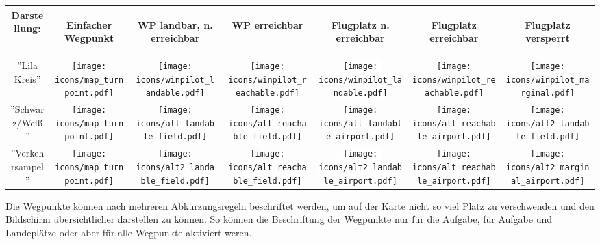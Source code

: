 \begin{tabular}{c|c|cc|ccc|} 
\textbf{Darstellung:} &\begin{sideways}Einfacher Wegpunkt \end{sideways}
&\begin{sideways}WP landbar,  n.  erreichbar\end{sideways}
&\begin{sideways}WP erreichbar\end{sideways}
&\begin{sideways}Flugplatz n. erreichbar\end{sideways}
&\begin{sideways}Flugplatz erreichbar\end{sideways}
&\begin{sideways}Flugplatz versperrt\end{sideways}\\
\hline
''Lila Kreis'' &
\texttt{[image: icons/map\_turnpoint.pdf]} &
\texttt{[image: icons/winpilot\_landable.pdf]} &
\texttt{[image: icons/winpilot\_reachable.pdf]} &
\rule[0em]{0em}{2.5em}\colorbox{white}{\texttt{[image: icons/winpilot\_landable.pdf]}}
& \texttt{[image: icons/winpilot\_reachable.pdf]} 
& \texttt{[image: icons/winpilot\_marginal.pdf]} \\
\hline
''Schwarz/Weiß''  &
\texttt{[image: icons/map\_turnpoint.pdf]} &
\texttt{[image: icons/alt\_landable\_field.pdf]} &
\texttt{[image: icons/alt\_reachable\_field.pdf]} &
\rule[0em]{0em}{2.5em}\colorbox[rgb]{0.94,0.94,0.94}{\texttt{[image: icons/alt\_landable\_airport.pdf]}}
& \texttt{[image: icons/alt\_reachable\_airport.pdf]} 
& \texttt{[image: icons/alt2\_landable\_field.pdf]}\\
\hline
''Verkehrsampel'' &
\texttt{[image: icons/map\_turnpoint.pdf]} &
\texttt{[image: icons/alt2\_landable\_field.pdf]} &
\texttt{[image: icons/alt\_reachable\_field.pdf]} &
\rule[0em]{0em}{2.5em}\colorbox{white}{\texttt{[image: icons/alt2\_landable\_airport.pdf]}}
&\texttt{[image: icons/alt\_reachable\_airport.pdf]} 
&\texttt{[image: icons/alt2\_marginal\_airport.pdf]}\\
\hline
\end{tabular}
%
 
Die Wegpunkte können nach mehreren Abkürzungsregeln beschriftet werden, um auf 
 der Karte nicht so viel Platz zu verschwenden und den Bildschirm  übersichtlicher darstellen zu können. 
So können die Beschriftung der Wegpunkte nur für die Aufgabe, für Aufgabe und Landeplätze oder aber für alle Wegpunkte aktiviert weren.


